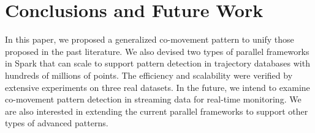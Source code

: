 \section{Conclusions and Future Work}
\label{sec:concl}
In this paper, we proposed a generalized co-movement pattern to unify those proposed in the past literature. We also devised two types of parallel frameworks in Spark that can scale to support pattern detection in trajectory databases with hundreds of millions of points. The efficiency and scalability were verified by extensive experiments on three real datasets. In the future, we intend to examine co-movement pattern detection in streaming data for real-time monitoring. We are also interested in extending the current parallel frameworks to support other types of advanced patterns.